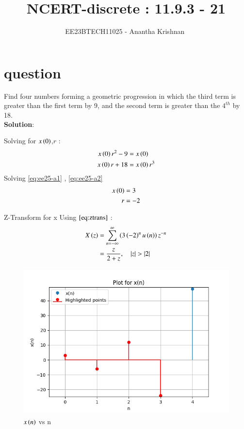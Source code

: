 \documentclass[journal,12pt,onecolumn]{IEEEtran}
\theoremstyle{remark}
\begin{document}

\vspace{3cm}

\title{NCERT-discrete : 11.9.3 - 21}
\author{EE23BTECH11025 - Anantha Krishnan $^{}$%
}
\maketitle
\bigskip

\renewcommand{\thefigure}{\theenumi}
\renewcommand{\thetable}{\theenumi}
\section{question}
Find four numbers forming a geometric progression in which the third term is greater than the first term by 9, and the second term is greater than the $4^{th}$ by 18.\\

\textbf{Solution}:


\begin{enumerate}
    Solving for $x\left(0\right)$,$r$ :
   \begin{align}
x\left(0\right)r^2 - 9 &= x\left(0\right) \label{eq:ee25-a1}\\
x\left(0\right)r + 18 &= x\left(0\right)r^3\label{eq:ee25-a2}
\end{align}
Solving  \eqref{eq:ee25-a1} , \eqref{eq:ee25-a2}
\begin{align}
    x\left(0\right) &= 3\\
    r &= -2
\end{align}

 Z-Transform for x 
    Using $\eqref{eq:ztrans}$ :
    \begin{align}
    X\left(z\right) &= \sum_{n=-\infty}^{\infty}\left(3\left(-2\right)^nu \left(n\right)\right)z^{-n} \\
    &= \frac{z}{2+z} ,\quad \left\vert z\right\vert>\left\vert2\right\vert 
    \end{align}
    
\end{enumerate}
    \begin{figure}[!ht]
    \centering
\graphicspath{ {figs/} }
\includegraphics[width=12cm, height=8cm]{graph_1}
\caption{ $x\left(n\right)$ vs n }
\label{graph:ee25-ag2}
\end{figure}







 
\end{document}
